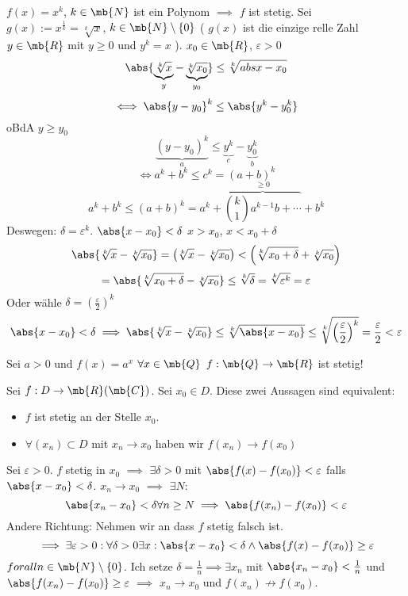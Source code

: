 \begin{Bsp}
  $f(x)=x^k$, $k\in\mb{N}$ ist ein Polynom $\implies$ $f$ ist stetig. Sei $g(x):=x^\frac{1}{k}=\sqrt[k]{x}$, $k\in\mb{N}\setminus\left\{ 0 \right\}$ ( $g(x)$ ist die einzige relle Zahl $y\in\mb{R}$ mit $y\geq 0$ und $y^k=x$ ). $x_0\in\mb{R}$, $\varepsilon>0$
  \[\abs{\underbrace{\sqrt[k]{x}}_y-\underbrace{\sqrt[k]{x_0}}_{y_0}} \leq \sqrt[k]{abs{x-x_0}}\]
  \[\iff \abs{y-y_0}^k\leq\abs{y^k-y_0^k}\]
  oBdA $y\geq y_0$
  \[\underbrace{\left( y-y_0 \right)^k}_a\leq \underbrace{y^k}_c-\underbrace{y_0^k}_b\]
  \[\iff a^k+b^k\leq c^k=(a+b)^k\]
  \[a^k+b^k\leq (a+b)^k=a^k+\overbrace{\binom{k}{1}a^{k-1}b+\cdots}^{\geq 0}+b^k\]
  Deswegen: $\delta=\varepsilon^{k}$. $\abs{x-x_0}<\delta$ $x>x_0$, $x<x_0+\delta$
  \[\abs{\sqrt[k]{x}-\sqrt[k]{x_0}}=\left( \sqrt[k]{x}-\sqrt[k]{x_0} \right)<\left( \sqrt[k]{x_0+\delta}+\sqrt[k]{x_0} \right)\]
  \[=\abs{\sqrt[k]{x_0+\delta}-\sqrt[k]{x_0}}\leq\sqrt[k]{\delta}=\sqrt[k]{\varepsilon^k}=\varepsilon\]
  Oder wähle $\delta=\left( \frac{\varepsilon}{2} \right)^k$
  \[\abs{x-x_0}< \delta \implies \abs{\sqrt[k]{x}-\sqrt[k]{x_0}}\leq\sqrt[k]{\abs{x-x_0}}\leq\sqrt[k]{\left( \frac{\varepsilon}{2} \right)^k}=\frac{\varepsilon}{2}<\varepsilon\]
\end{Bsp}
\begin{Bsp}
  Sei $a>0$ und $f(x)=a^x$ $\forall x\in\mb{Q}$ $f:\mb{Q}\to\mb{R}$ ist stetig!
\end{Bsp}
\begin{Sat}
  Sei $f:D\to\mb{R}(\mb{C})$. Sei $x_0\in D$. Diese zwei Aussagen sind equivalent:
  \begin{itemize}
    \item $f$ ist stetig an der Stelle $x_0$.
    \item $\forall(x_n)\subset D$ mit $x_n\to x_0$ haben wir $f(x_n)\to f(x_0)$
  \end{itemize}
\end{Sat}
\begin{Bew}
  Sei $\varepsilon >0$. $f$ stetig in $x_0$ $\implies$ $\exists\delta>0$ mit $\abs{f(x)-f(x_0)}<\varepsilon$ falls $\abs{x-x_0}<\delta$. $x_n\to x_0$ $\implies$ $\exists N$:
  \[\abs{x_n-x_0}<\delta\forall n\geq N\implies \abs{f(x_n)-f(x_0)}<\varepsilon\]
  Andere Richtung: Nehmen wir an dass $f$ stetig falsch ist.
  \[\implies \exists \varepsilon>0: \forall \delta>0 \exists x: \abs{x-x_0}<\delta\wedge\abs{f(x)-f(x_0)}\geq \varepsilon\]
  $forall n\in\mb{N}\setminus\left\{ 0 \right\}$. Ich setze $\delta=\frac{1}{n}\implies \exists x_n$ mit $\abs{x_n-x_0}<\frac{1}{n}$ und $\abs{f(x_n)-f(x_0)}\geq \varepsilon$ $\implies$ $x_n\to x_0$ und $f(x_n)\not\to f(x_0)$.
\end{Bew}
